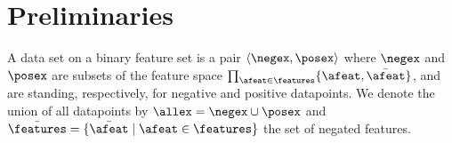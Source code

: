 \documentclass{article}
\begin{document}
%
%
%
%
%
%
%

\section{Preliminaries}

A data set on a binary feature set \features is a pair $\langle \negex,\posex \rangle$ where $\negex$ and $\posex$ are subsets of the feature space $\prod_{\afeat \in \features}\{\afeat,\bar{\afeat}\}$, and are standing, respectively, for negative and positive datapoints.
We denote the union of all datapoints by $\allex = \negex \cup \posex$ and $\bar{\features} = \{\bar{\afeat} \mid \afeat \in \features\}$ the set of negated features.
\end{document}
